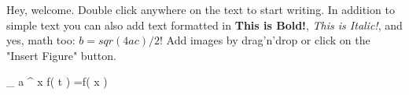 Hey, welcome. Double click anywhere on the text to start writing. In addition to simple text you can also add text formatted in \textbf{This is Bold!}, \textit{This is Italic!}, and yes, math too: $b = sqr(4ac)/2$! Add images by drag'n'drop or click on the "Insert Figure" button.

 \int _{ a }^{ x }{ f\left( t \right) =f\left( x \right)  }